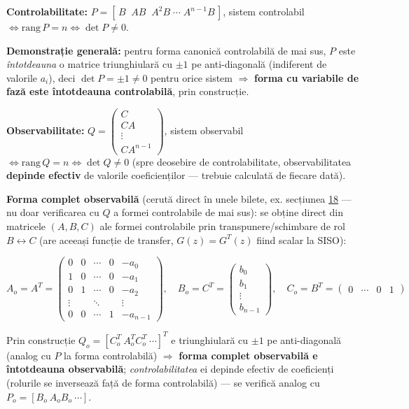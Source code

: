 \documentclass[10pt,a4paper]{article}
\begin{document}
\textbf{Controlabilitate:} $P=[\,B\;\;AB\;\;A^2B\;\cdots\;A^{n-1}B\,]$, sistem controlabil $\iff \mathrm{rang}\,P=n\iff\det P\ne0$.
\begin{keyeq}\color{red!65!black}
\textbf{Demonstrație generală:} pentru forma canonică controlabilă de mai sus, $P$ este \emph{întotdeauna} o matrice triunghiulară cu $\pm1$ pe anti-diagonală (indiferent de valorile $a_i$), deci $\det P=\pm1\ne0$ pentru orice sistem $\Rightarrow$ \textbf{forma cu variabile de fază este întotdeauna controlabilă}, prin construcție.
\end{keyeq}

\textbf{Observabilitate:} $Q=\begin{pmatrix}C\\CA\\\vdots\\CA^{n-1}\end{pmatrix}$, sistem observabil $\iff \mathrm{rang}\,Q=n\iff\det Q\ne0$ (spre deosebire de controlabilitate, observabilitatea \textbf{depinde efectiv} de valorile coeficienților — trebuie calculată de fiecare dată).

\textbf{Forma complet observabilă} (cerută direct în unele bilete, ex. secțiunea \hyperref[sec:18]{18} — nu doar verificarea cu $Q$ a formei controlabile de mai sus): se obține direct din matricele $(A,B,C)$ ale formei controlabile prin transpunere/schimbare de rol $B\leftrightarrow C$ (are aceeași funcție de transfer, $G(z)=G^T(z)$ fiind scalar la SISO):
\begin{keyeq}\color{red!65!black}
$$A_o=A^{T}=\begin{pmatrix}0&0&\cdots&0&-a_0\\1&0&\cdots&0&-a_1\\0&1&\cdots&0&-a_2\\\vdots&&\ddots&&\vdots\\0&0&\cdots&1&-a_{n-1}\end{pmatrix},\quad B_o=C^{T}=\begin{pmatrix}b_0\\b_1\\\vdots\\b_{n-1}\end{pmatrix},\quad C_o=B^{T}=\begin{pmatrix}0&\cdots&0&1\end{pmatrix}$$
\end{keyeq}
Prin construcție $Q_o=[C_o^T\ A_o^TC_o^T\ \cdots]^T$ e triunghiulară cu $\pm1$ pe anti-diagonală (analog cu $P$ la forma controlabilă) $\Rightarrow$ \textbf{forma complet observabilă e întotdeauna observabilă}; \emph{controlabilitatea} ei depinde efectiv de coeficienți (rolurile se inversează față de forma controlabilă) — se verifică analog cu $P_o=[B_o\ A_oB_o\ \cdots]$.
\end{document}
